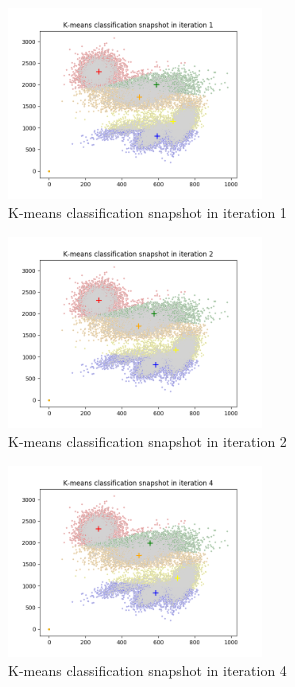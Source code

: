 \documentclass[12pt,a4paper]{article}
\begin{document}
\begin{enumerate}[start=2,label*={\arabic*.}]
\begin{enumerate}
\begin{figure}[H]
  \centering
  \includegraphics[width=0.6\textwidth]{figures/kmcl_1.png}
	\caption{K-means classification snapshot in iteration 1}
	\label{kmcl_1}
\end{figure}

\begin{figure}[H]
  \centering
  \includegraphics[width=0.6\textwidth]{figures/kmcl_2.png}
	\caption{K-means classification snapshot in iteration 2}
	\label{kmcl_2}
\end{figure}

\begin{figure}[H]
  \centering
  \includegraphics[width=0.6\textwidth]{figures/kmcl_4.png}
	\caption{K-means classification snapshot in iteration 4}
	\label{kmcl_4}
\end{figure}


\end{enumerate}
\end{enumerate}
\end{document}

